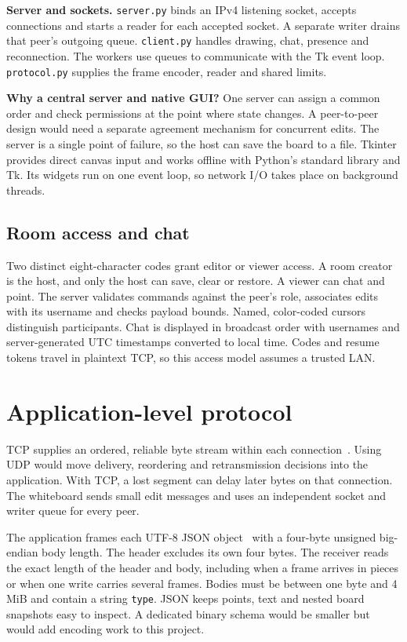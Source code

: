 \documentclass[11pt,a4paper]{article}
\newcommand{\code}[1]{\texttt{#1}}
\begin{document}
\textbf{Server and sockets.}
\code{server.py} binds an IPv4 listening socket, accepts connections and starts a reader for each accepted socket. A separate writer drains that peer's outgoing queue. \code{client.py} handles drawing, chat, presence and reconnection. The workers use queues to communicate with the Tk event loop. \code{protocol.py} supplies the frame encoder, reader and shared limits.

\textbf{Why a central server and native GUI?}
One server can assign a common order and check permissions at the point where state changes. A peer-to-peer design would need a separate agreement mechanism for concurrent edits. The server is a single point of failure, so the host can save the board to a file. Tkinter provides direct canvas input and works offline with Python's standard library and Tk. Its widgets run on one event loop, so network I/O takes place on background threads.

\subsection{Room access and chat}

Two distinct eight-character codes grant editor or viewer access. A room creator is the host, and only the host can save, clear or restore. A viewer can chat and point. The server validates commands against the peer's role, associates edits with its username and checks payload bounds. Named, color-coded cursors distinguish participants. Chat is displayed in broadcast order with usernames and server-generated UTC timestamps converted to local time. Codes and resume tokens travel in plaintext TCP, so this access model assumes a trusted LAN.

\clearpage
\section{Application-level protocol}

TCP supplies an ordered, reliable byte stream within each connection~\cite{tcp}. Using UDP would move delivery, reordering and retransmission decisions into the application. With TCP, a lost segment can delay later bytes on that connection. The whiteboard sends small edit messages and uses an independent socket and writer queue for every peer.

The application frames each UTF-8 JSON object~\cite{json} with a four-byte unsigned big-endian body length. The header excludes its own four bytes. The receiver reads the exact length of the header and body, including when a frame arrives in pieces or when one write carries several frames. Bodies must be between one byte and 4 MiB and contain a string \code{type}. JSON keeps points, text and nested board snapshots easy to inspect. A dedicated binary schema would be smaller but would add encoding work to this project.
\end{document}
